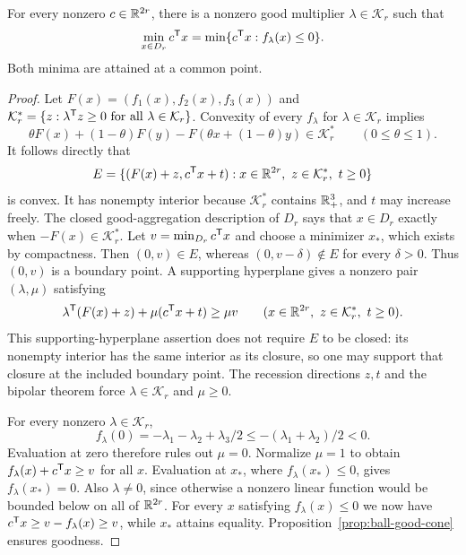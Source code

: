 \begin{proposition}\label{prop:one-objective}
For every nonzero $c\in\mathbb R^{2r}$, there is a nonzero good multiplier
$\lambda\in\mathcal K_r$ such that
\begin{equation}\label{eq:one-objective}
 \min_{x\in D_r}c^{\mathsf T} x
 =\min\{c^{\mathsf T} x:f_\lambda(x)\leq0\}.
\end{equation}
Both minima are attained at a common point.
\end{proposition}
\begin{proof}
Let $F(x)=(f_1(x),f_2(x),f_3(x))$ and
$\mathcal K_r^*=\{z:\lambda^{\mathsf T} z\geq0\text{ for all }
\lambda\in\mathcal K_r\}$. Convexity of every $f_\lambda$ for
$\lambda\in\mathcal K_r$ implies
\[
 \theta F(x)+(1-\theta)F(y)-F(\theta x+(1-\theta)y)
 \in\mathcal K_r^*\qquad(0\leq\theta\leq1).
\]
It follows directly that
\[
 E=\{(F(x)+z,c^{\mathsf T} x+t):x\in\mathbb R^{2r},\
                            z\in\mathcal K_r^*,\ t\geq0\}
\]
is convex. It has nonempty interior because
$\mathcal K_r^*$ contains $\mathbb R^3_+$, and $t$ may increase freely.
The closed good-aggregation description of $D_r$ says that
$x\in D_r$ exactly when $-F(x)\in\mathcal K_r^*$.
Let $v=\min_{D_r}c^{\mathsf T} x$ and choose a minimizer $x_*$,
which exists by compactness. Then $(0,v)\in E$, whereas
$(0,v-\delta)\notin E$ for every $\delta>0$.
Thus $(0,v)$ is a boundary point. A supporting hyperplane gives
a nonzero pair $(\lambda,\mu)$ satisfying
\[
 \lambda^{\mathsf T}(F(x)+z)+\mu(c^{\mathsf T} x+t)\geq\mu v
 \qquad(x\in\mathbb R^{2r},\ z\in\mathcal K_r^*,\ t\geq0).
\]
This supporting-hyperplane assertion does not require $E$ to be
closed: its nonempty interior has the same interior as its closure,
so one may support that closure at the included boundary point.
The recession directions $z,t$ and the bipolar theorem force
$\lambda\in\mathcal K_r$ and $\mu\geq0$.

For every nonzero $\lambda\in\mathcal K_r$,
\[
 f_\lambda(0)=-\lambda_1-\lambda_2+\lambda_3/2
 \leq-(\lambda_1+\lambda_2)/2<0.
\]
Evaluation at zero therefore rules out $\mu=0$. Normalize
$\mu=1$ to obtain
$f_\lambda(x)+c^{\mathsf T} x\geq v$ for all $x$.
Evaluation at $x_*$, where $f_\lambda(x_*)\leq0$, gives
$f_\lambda(x_*)=0$. Also $\lambda\ne0$, since otherwise a
nonzero linear function would be bounded below on all of $\mathbb R^{2r}$.
For every $x$ satisfying $f_\lambda(x)\leq0$ we now have
$c^{\mathsf T} x\geq v-f_\lambda(x)\geq v$, while $x_*$ attains
equality. Proposition~\ref{prop:ball-good-cone} ensures goodness.
\end{proof}

